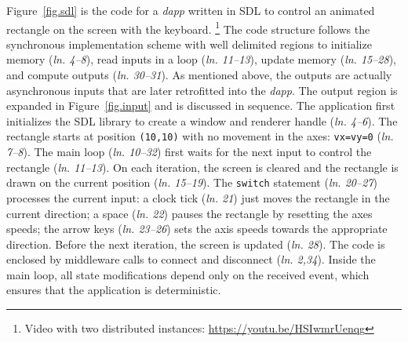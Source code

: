 \documentclass[sigplan,screen]{acmart}
\newcommand{\lin}[1]{(\emph{ln. #1}\xspace)}
\newcommand{\dapp}{\emph{dapp}\xspace}
\begin{document}
Figure~\ref{fig.sdl} is the code for a \dapp written in SDL to control an
animated rectangle on the screen with the keyboard.%
\footnote {
    Video with two distributed instances: \url{https://youtu.be/HSIwmrUenqg}
}
The code structure follows the synchronous implementation scheme with well
delimited regions to initialize memory \lin{4--8}, read inputs in a loop
\lin{11--13}, update memory \lin{15--28}, and compute outputs \lin{30--31}.
As mentioned above, the outputs are actually asynchronous inputs that are later
retrofitted into the \dapp.
The output region is expanded in Figure~\ref{fig.input} and is discussed in
sequence.
The application first initializes the SDL library to create a window and
renderer handle \lin{4--6}.
The rectangle starts at position \texttt{(10,10)} with no movement in the axes:
\texttt{vx=vy=0} \lin{7--8}.
The main loop \lin{10--32} first waits for the next input to control the
rectangle \lin{11--13}.
On each iteration, the screen is cleared and the rectangle is drawn on the
current position \lin{15--19}.
The \texttt{switch} statement \lin{20--27} processes the current input:
    a clock tick \lin{21} just moves the rectangle in the current direction;
    a space \lin{22} pauses the rectangle by resetting the axes speeds;
    the arrow keys \lin{23--26} sets the axis speeds towards the appropriate direction.
Before the next iteration, the screen is updated \lin{28}.
The code is enclosed by middleware calls to connect and disconnect \lin{2,34}.
Inside the main loop, all state modifications depend only on the received
event, which ensures that the application is deterministic.
\end{document}
